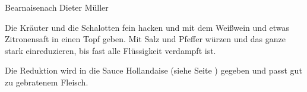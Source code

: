 \begin{recipe}{Bearnaise}{nach Dieter Müller}
  \label{Bearnaise}
  \inglist

  \steps
  Die Kräuter und die Schalotten fein hacken und mit dem Weißwein und etwas Zitronensaft
  in einen Topf geben. Mit Salz und Pfeffer würzen und das ganze stark einreduzieren, bis
  fast alle Flüssigkeit verdampft ist.

  Die Reduktion wird in die Sauce Hollandaise (siehe Seite \pageref{Hollandaise}) gegeben
  und passt gut zu gebratenem Fleisch.
\end{recipe}
